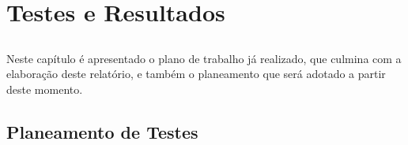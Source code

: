 \chapter{Testes e Resultados} \label{chap:testes}

\section*{}

Neste capítulo é apresentado o plano de trabalho já realizado, que culmina com a elaboração deste relatório, e também o planeamento que será adotado a partir deste momento.

\section{Planeamento de Testes}